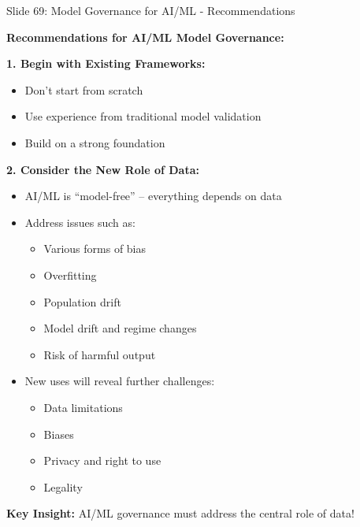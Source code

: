 \documentclass[8pt]{beamer}
\begin{document}
\begin{frame}{Slide 69: Model Governance for AI/ML - Recommendations}
	\fontsize{6.5}{7.5}\selectfont
	
	\textbf{Recommendations for AI/ML Model Governance:}
	
	\vspace{0.1cm}
	\textbf{1. Begin with Existing Frameworks:}
	\begin{itemize}
		\item Don't start from scratch
		\item Use experience from traditional model validation
		\item Build on a strong foundation
	\end{itemize}
	
	\vspace{0.1cm}
	\textbf{2. Consider the New Role of Data:}
	\begin{itemize}
		\item AI/ML is ``model-free'' -- everything depends on data
		\item Address issues such as:
		\begin{itemize}
			\item Various forms of bias
			\item Overfitting
			\item Population drift
			\item Model drift and regime changes
			\item Risk of harmful output
		\end{itemize}
		
		\item New uses will reveal further challenges:
		\begin{itemize}
			\item Data limitations
			\item Biases
			\item Privacy and right to use
			\item Legality
		\end{itemize}
	\end{itemize}
	
	\textcolor{myblue}{\textbf{Key Insight:}}
	AI/ML governance must
	\textcolor{myblue}{address the central role of data}!
\end{frame}
\end{document}
